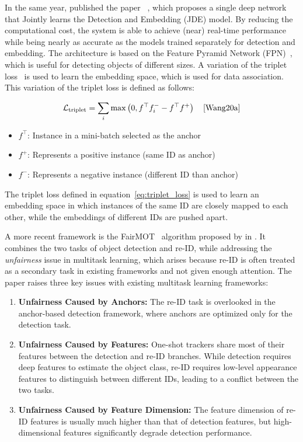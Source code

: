 In the same year, \citeauthor{Wang20a} published the paper ~\cite{Wang20a}, which proposes a single deep network that Jointly learns the Detection and Embedding (JDE) model. By reducing the computational cost, the system is able to achieve (near) real-time performance while being nearly as accurate as the models trained separately for detection and embedding. The architecture is based on the Feature Pyramid Network (FPN)~\cite{Lin17}, which is useful for detecting objects of different sizes. A variation of the triplet loss~\cite{Schroff15} is used to learn the embedding space, which is used for data association. This variation of the triplet loss is defined as follows:

\begin{equation}
    \label{eq:triplet_loss}
    \mathcal{L}_{\text{triplet}}=\sum_i \max \left(0, f^{\top} f_i^{-}-f^{\top} f^{+}\right)
    \quad\text{\cite[Eq.~1]{Wang20a}}
\end{equation}

\begin{itemize}
    \item \(f^{\top}\): Instance in a mini-batch selected as the anchor
    \item \(f^{+}\): Represents a positive instance (same ID as anchor)
    \item \(f^{-}\): Represents a negative instance (different ID than anchor)
\end{itemize}

The triplet loss defined in equation~\ref{eq:triplet_loss} is used to learn an embedding space in which instances of the same ID are closely mapped to each other, while the embeddings of different IDs are pushed apart.

A more recent framework is the FairMOT~\cite{Zhang21} algorithm proposed by \citeauthor{Zhang21} in \citeyear{Zhang21}. It combines the two tasks of object detection and re-ID, while addressing the \textit{unfairness} issue in multitask learning, which arises because re-ID is often treated as a secondary task in existing frameworks and not given enough attention. The paper raises three key issues with existing multitask learning frameworks:

\begin{enumerate}
    \item \textbf{Unfairness Caused by Anchors:} The re-ID task is overlooked in the anchor-based detection framework, where anchors are optimized only for the detection task.
    \item \textbf{Unfairness Caused by Features:} One-shot trackers share most of their features between the detection and re-ID branches. While detection requires deep features to estimate the object class, re-ID requires low-level appearance features to distinguish between different IDs, leading to a conflict between the two tasks.
    \item \textbf{Unfairness Caused by Feature Dimension:} The feature dimension of re-ID features is usually much higher than that of detection features, but high-dimensional features significantly degrade detection performance.
\end{enumerate}

